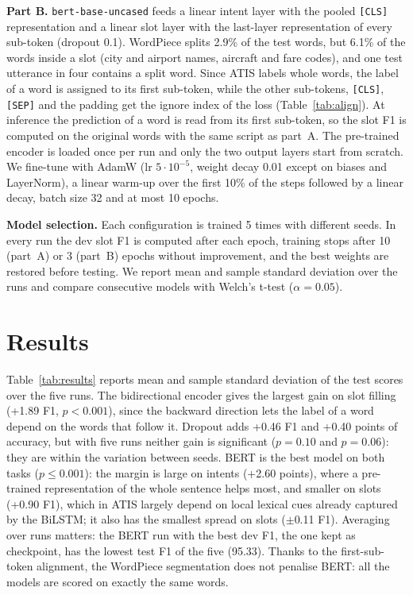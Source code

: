 \documentclass[a4paper]{article}
\begin{document}
\textbf{Part B.} \texttt{bert-base-uncased} feeds a linear intent layer with the pooled \texttt{[CLS]}
representation and a linear slot layer with the last-layer representation of every sub-token (dropout 0.1).
WordPiece \cite{wu2016wordpiece} splits 2.9\% of the test words, but 6.1\% of the words inside a slot (city and
airport names, aircraft and fare codes), and one test utterance in four contains a split word. Since ATIS labels
whole words, the label of a word is assigned to its first sub-token, while the other sub-tokens, \texttt{[CLS]},
\texttt{[SEP]} and the padding get the ignore index of the loss (Table~\ref{tab:align}). At inference the
prediction of a word is read from its first sub-token, so the slot F1 is computed on the original words with the
same script as part~A. The pre-trained encoder is loaded once per run and only the two output layers start from
scratch. We fine-tune with AdamW \cite{loshchilov2019adamw} (lr $5\cdot10^{-5}$, weight decay 0.01 except on biases
and LayerNorm), a linear warm-up over the first 10\% of the steps followed by a linear decay, batch size 32 and at
most 10 epochs.

\textbf{Model selection.} Each configuration is trained 5 times with different seeds. In every run the dev slot F1
is computed after each epoch, training stops after 10 (part~A) or 3 (part~B) epochs without improvement, and the
best weights are restored before testing. We report mean and sample standard deviation over the runs and compare
consecutive models with Welch's t-test ($\alpha = 0.05$).

\section{Results}

Table~\ref{tab:results} reports mean and sample standard deviation of the test scores over the five runs. The
bidirectional encoder gives the largest gain on slot filling (+1.89 F1, $p<0.001$), since the backward direction
lets the label of a word depend on the words that follow it. Dropout adds +0.46 F1 and +0.40 points of accuracy,
but with five runs neither gain is significant ($p=0.10$ and $p=0.06$): they are within the variation between
seeds. BERT is the best model on both tasks ($p \le 0.001$): the margin is large on intents (+2.60 points), where a
pre-trained representation of the whole sentence helps most, and smaller on slots (+0.90 F1), which in ATIS
largely depend on local lexical cues already captured by the BiLSTM; it also has the smallest spread on slots
($\pm$0.11 F1). Averaging over runs matters: the BERT run with the best dev F1, the one kept as
checkpoint, has the lowest test F1 of the five (95.33). Thanks to the first-sub-token alignment, the WordPiece
segmentation does not penalise BERT: all the models are scored on exactly the same words.
\end{document}
